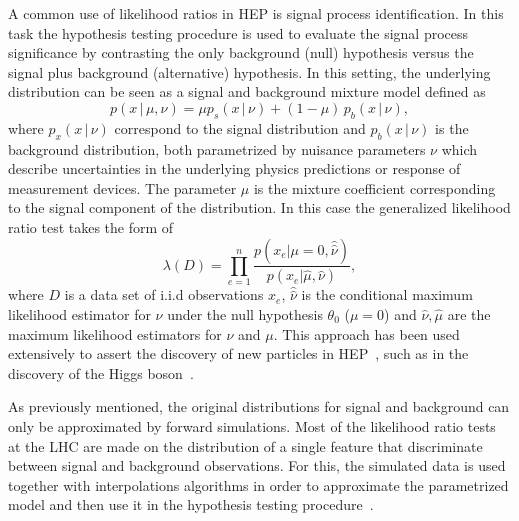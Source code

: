 \documentclass[a4paper]{jpconf}
\begin{document}
A common use of likelihood ratios in HEP is signal process identification. In this task the hypothesis testing procedure is used to evaluate the signal process significance by contrasting the only background (null) hypothesis versus the signal plus background (alternative) hypothesis. In this setting, the underlying distribution can be seen as a signal and background mixture model defined as
\begin{equation}\label{eq:sigbkg}
p( x \,|\, \mu, \nu) =  \mu p_s( x \, |\,  \nu)  + (1-\mu)\, p_b( x \,|\, \nu) ,
\end{equation}
where $p_x(x \, |\, \nu)$ correspond to the signal distribution and $p_b(x \, |\, \nu)$ is the background distribution, both parametrized by nuisance parameters $\nu$ which describe uncertainties in the underlying physics predictions or response of measurement devices. The parameter $\mu$ is the mixture coefficient corresponding to the signal component of the distribution. In this case the generalized likelihood ratio test takes the form of 
\begin{equation}
\lambda(D) = \prod_{e=1}^n \frac{ p(x_e|\mu=0,\hat{\hat{\nu}})}{ p(x_e|\hat \mu, \hat \nu)},
\end{equation}
where $D$ is a data set of i.i.d observations $x_e$, $\hat {\hat \nu}$ is the conditional maximum likelihood estimator for $\nu$ under the null hypothesis $\theta_0$ ($\mu = 0$) and $\hat{\nu}, \hat{\mu}$ are the maximum likelihood estimators for $\nu$ and $\mu$. This approach has been used extensively to assert the discovery of new particles in HEP~\cite{Cowan:2010js}, such as in the discovery of the Higgs boson~\cite{Aad:2012tfa,Chatrchyan:2012ufa}.

As previously mentioned, the original distributions for signal and background can only be approximated by forward simulations. Most of the likelihood ratio tests at the LHC are made on the distribution of a single feature that discriminate between signal and background observations. For this, the simulated data is used together with interpolations algorithms in order to approximate the parametrized model and then use it in the hypothesis testing procedure~\cite{Cranmer:2012sba}.

\end{document}
